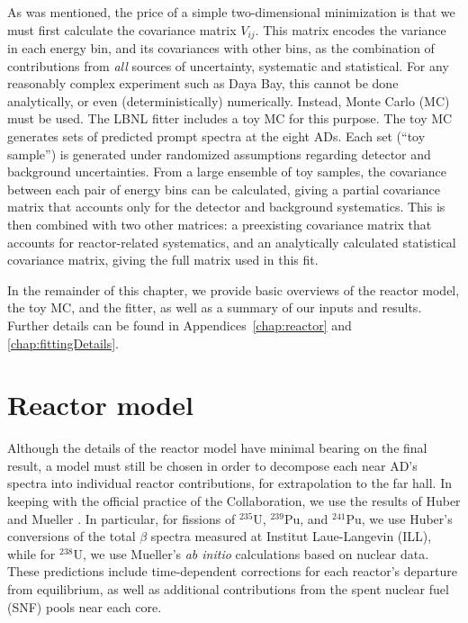 \documentclass[../thesis.tex]{subfiles}
\begin{document}
As was mentioned, the price of a simple two-dimensional minimization is that we must first calculate the covariance matrix $V_{ij}$. This matrix encodes the variance in each energy bin, and its covariances with other bins, as the combination of contributions from \emph{all} sources of uncertainty, systematic and statistical. For any reasonably complex experiment such as Daya Bay, this cannot be done analytically, or even (deterministically) numerically. Instead, Monte Carlo (MC) must be used. The LBNL fitter includes a toy MC for this purpose. The toy MC generates sets of predicted prompt spectra at the eight ADs. Each set (``toy sample'') is generated under randomized assumptions regarding detector and background uncertainties. From a large ensemble of toy samples, the covariance between each pair of energy bins can be calculated, giving a partial covariance matrix that accounts only for the detector and background systematics. This is then combined with two other matrices: a preexisting covariance matrix that accounts for reactor-related systematics, and an analytically calculated statistical covariance matrix, giving the full matrix used in this fit.

In the remainder of this chapter, we provide basic overviews of the reactor model, the toy MC, and the fitter, as well as a summary of our inputs and results. Further details can be found in Appendices~\ref{chap:reactor} and \ref{chap:fittingDetails}.

\section{Reactor model}
\label{sec:fittingReactor}

Although the details of the reactor model have minimal bearing on the final result, a model must still be chosen in order to decompose each near AD's spectra into individual reactor contributions, for extrapolation to the far hall. In keeping with the official practice of the Collaboration, we use the results of Huber \cite{PhysRevC.84.024617} and Mueller \cite{PhysRevC.83.054615}. In particular, for fissions of $^{235}$U, $^{239}$Pu, and $^{241}$Pu, we use Huber's conversions of the total $\beta$ spectra measured at Institut Laue-Langevin (ILL), while for $^{238}$U, we use Mueller's \emph{ab initio} calculations based on nuclear data. These predictions include time-dependent corrections for each reactor's departure from equilibrium, as well as additional contributions from the spent nuclear fuel (SNF) pools near each core.
\end{document}
